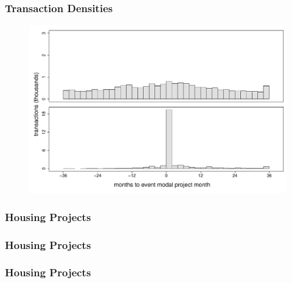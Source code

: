 \documentclass[aspectratio=149]{beamer}
\begin{document}

\begin{frame}
\frametitle{Transaction Densities}
\begin{center}
\begin{figure}
\includegraphics[scale=0.32]{figures/summary_densitytime.pdf}
\vspace{-3mm}
\end{figure}
\end{center}
\end{frame}



\begin{frame}
\frametitle{Housing Projects}
\vspace{-1.5mm}
\begin{table}
{\footnotesize

}
\end{table}
\end{frame}


\begin{frame}
\frametitle{Housing Projects}
\vspace{-1.5mm}
\begin{table}
{\footnotesize

}
\end{table}
\end{frame}


\begin{frame}
\frametitle{Housing Projects}
\vspace{-1.5mm}
\begin{table}
{\footnotesize

}
\end{table}
\end{frame}
\end{document}
